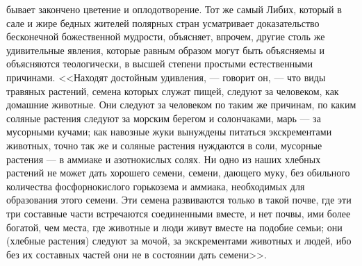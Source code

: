 \documentclass[12pt]{article}
\begin{document}
бывает закончено цветение и оплодотворение. Тот же самый Либих, который в сале и жире бедных жителей полярных стран усматривает доказательство бесконечной божественной мудрости, объясняет, впрочем, другие столь же удивительные явления, которые равным образом могут быть объясняемы и объясняются теологически, в высшей степени простыми естественными причинами. <<Находят достойным удивления, --- говорит он, --- что виды травяных растений, семена которых служат пищей, следуют за человеком, как домашние животные. Они следуют за человеком по таким же причинам, по каким соляные растения следуют за морским берегом и солончаками, марь --- за мусорными кучами; как навозные жуки вынуждены питаться экскрементами животных, точно так же и соляные растения нуждаются в соли, мусорные растения --- в аммиаке и азотнокислых солях. Ни одно из наших хлебных растений не может дать хорошего семени, семени, дающего муку, без обильного количества фосфорнокислого горькозема и аммиака, необходимых для образования этого семени. Эти семена развиваются только в такой почве, где эти три составные части встречаются соединенными вместе, и нет почвы, ими более богатой, чем места, где животные и люди живут вместе на подобие семьи; они (хлебные растения) следуют за мочой, за экскрементами животных и людей, ибо без их составных частей они не в состоянии дать семени>>. 
\end{document}
